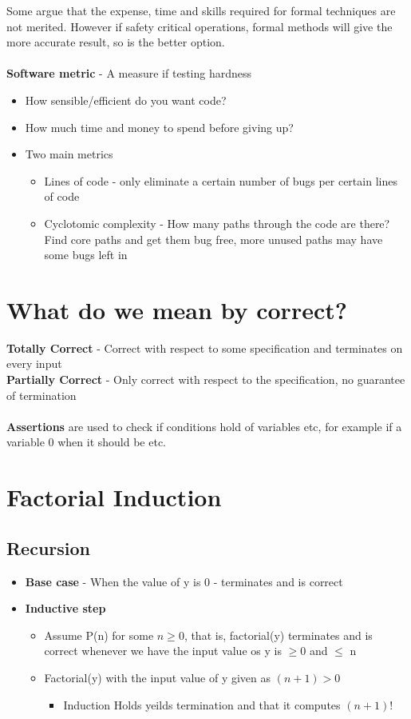 \documentclass{article}[18pt]
\begin{document}
Some argue that the expense, time and skills required for formal techniques are not merited. However if safety critical operations, formal methods will give the more accurate result, so is the better option. \\
\\
\textbf{Software metric} - A measure if testing hardness
\begin{itemize}
	\item How sensible/efficient do you want code?
	\item How much time and money to spend before giving up?
	\item Two main metrics
	\begin{itemize}
		\item Lines of code - only eliminate a certain number of bugs per certain lines of code
		\item Cyclotomic complexity - How many paths through the code are there? Find core paths and get them bug free, more unused paths may have some bugs left in
	\end{itemize}
\end{itemize}
\section{What do we mean by correct?}
\textbf{Totally Correct} - Correct with respect to some specification and terminates on every input\\
\textbf{Partially Correct} - Only correct with respect to the specification, no guarantee of termination\\
\\
\textbf{Assertions} are used to check if conditions hold of variables etc, for example if a variable 0 when it should be etc.
\section{Factorial Induction}
\subsection{Recursion}
\begin{itemize}
	\item \textbf{Base case} - When the value of y is 0 - terminates and is correct
	\item \textbf{Inductive step}
	\begin{itemize}
		\item Assume P(n) for some $n\geqslant 0$, that is, factorial(y) terminates and is correct whenever we have the input value os y is $\geqslant 0$ and $\leqslant$ n
		\item Factorial(y) with the input value of y given as $(n+1)>0$
		\begin{itemize}
			\item Induction Holds yeilds termination and that it computes $(n+1)!$
		\end{itemize}
	\end{itemize}
\end{itemize}
\end{document}
